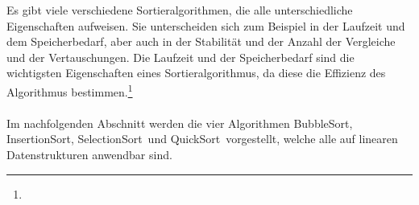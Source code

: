 \documentclass[../entry.tex]{subfiles}
\begin{document}
    Es gibt viele verschiedene Sortieralgorithmen, die alle unterschiedliche Eigenschaften aufweisen.
    Sie unterscheiden sich zum Beispiel in der Laufzeit und dem Speicherbedarf, aber auch in der Stabilität und der Anzahl der Vergleiche und der Vertauschungen.
    Die Laufzeit und der Speicherbedarf sind die wichtigsten Eigenschaften eines Sortieralgorithmus,
    da diese die Effizienz des Algorithmus bestimmen.\footnote{}
    \\\\
    Im nachfolgenden Abschnitt werden die vier Algorithmen \dq BubbleSort\dq, \dq InsertionSort\dq, \dq SelectionSort\dq\ und \dq QuickSort\dq\ vorgestellt,
    welche alle auf linearen Datenstrukturen anwendbar sind.
\end{document}
